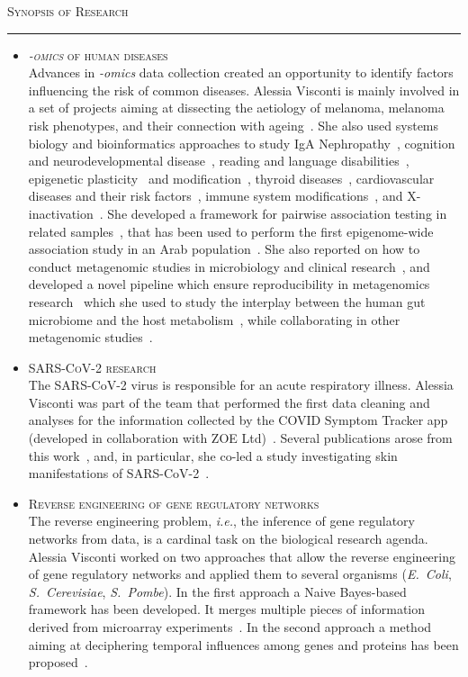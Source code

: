 \documentclass[a4paper,10pt]{article}
\newcommand{\mediumtitle}[1]{
	\vspace{0.2cm}
	{\noindent
	\Large \textsc{#1}\\[-2ex]
	\hrule
	\vspace{0.2cm}}
}
\newcommand{\smalltitle}[1]{
	\vspace{0.1cm}
	{\noindent 
	\large \textsc{#1}}
	\vspace{0.1cm}
}
\newcommand{\bulletitem}{\item[$\bullet$]}
\begin{document}
\newpage


\mediumtitle{Synopsis of Research}

\begin{itemize}
	
\bulletitem \smalltitle{\emph{-omics} of human diseases}\\
Advances in \emph{-omics} data collection created an opportunity to identify factors influencing the risk of common diseases. Alessia Visconti is mainly involved in a set of projects aiming at dissecting the aetiology of melanoma, melanoma risk phenotypes, and their connection with ageing~\cite{Rib16,Pui16,Hys18,Vis18a,Duf17,Vis19a,Vis20,Lan20,San20,Gro21,Swi15}. 
She also used systems biology and bioinformatics approaches to study IgA Nephropathy~\cite{Lom16,Dot21}, cognition and neurodevelopmental disease~\cite{Joh15,Cul18}, reading and language disabilities~\cite{Gia16}, epigenetic plasticity~\cite{Car16} and modification~\cite{Zag18}, thyroid diseases~\cite{Mar20}, cardiovascular diseases and their risk factors~\cite{Ros21}, immune system modifications~\cite{Pia21}, and X-inactivation~\cite{Zit21}. 
She developed a framework for pairwise association testing in related samples~\cite{Vis16}, that has been used to perform the first epigenome-wide association study in an Arab population~\cite{AlM15}. 
She also reported on how to conduct metagenomic studies in microbiology and clinical research~\cite{Vis18c}, and developed a novel pipeline which ensure reproducibility in metagenomics research~\cite{Vis18b} which she used to study the interplay between the human gut microbiome and the host metabolism~\cite{Vis19}, while collaborating in other metagenomic studies~\cite{Bar20,LeR22}.

\bulletitem \smalltitle{SARS-CoV-2 research}\\
The SARS-CoV-2 virus is responsible for an acute respiratory illness.
Alessia Visconti was part of the team that performed the first data cleaning and analyses for the information collected by the COVID Symptom Tracker app (developed in collaboration with ZOE Ltd)~\cite{Mur21}. Several publications arose from this work~\cite{Men20,Lee20, Zaz20,Hop21,Wil21,Sud21}, and, in particular, she co-led a study investigating skin manifestations of SARS-CoV-2~\cite{Vis21}.

\bulletitem \smalltitle{Reverse engineering of gene regulatory networks}\\
The reverse engineering problem, \emph{i.e.}, the inference of gene regulatory networks from data, is a cardinal task on the biological research agenda.
Alessia Visconti worked on two approaches that allow the reverse engineering of gene regulatory networks and applied them to several organisms (\emph{E.~Coli}, \emph{S.~Cerevisiae}, \emph{S.~Pombe}). In the first approach a Naive Bayes-based framework has been developed. It merges multiple pieces of information derived from microarray experiments~\cite{Mar12, Vis11b}. In the second approach a method aiming at deciphering temporal influences among genes and proteins has been proposed~\cite{Vis12b}. 


\end{itemize}
\end{document}

